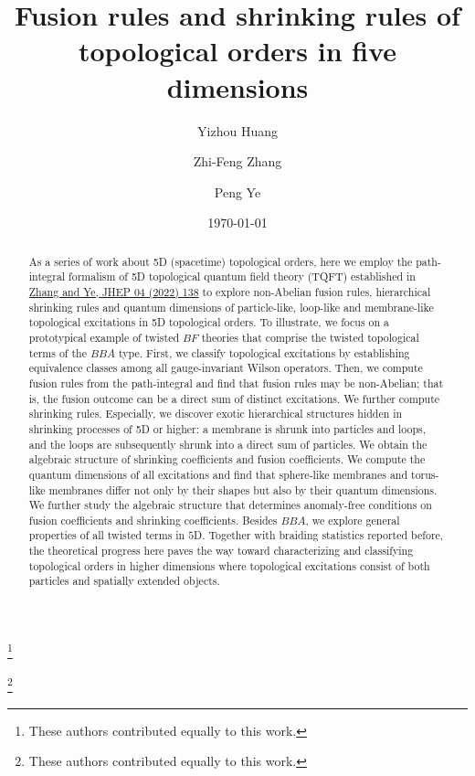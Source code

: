 \documentclass[11pt,nofootinbib,preprint]{revtex4-1}
\begin{document}
\title{Fusion rules and shrinking rules of topological orders in five dimensions}
\author{Yizhou Huang}
\thanks{These authors contributed equally to this work.}
 \author{Zhi-Feng Zhang}
\thanks{These authors contributed equally to this work.}
 \author{Peng Ye}
\date{\today}
\begin{abstract}
As a series of work about 5D (spacetime) topological orders, here we employ the path-integral formalism of 5D  topological quantum field theory  (TQFT) established in \href{https://doi.org/10.1007/JHEP04(2022)138}{Zhang and Ye, JHEP 04 (2022) 138}  to explore non-Abelian fusion rules,  hierarchical shrinking rules and quantum dimensions of particle-like, loop-like and membrane-like topological excitations in 5D topological orders.  To illustrate, we focus on a prototypical example of twisted $BF$ theories that comprise the twisted topological terms of the $BBA$ type. First, we classify topological excitations by establishing equivalence classes among all gauge-invariant Wilson operators. Then, we compute fusion rules from the path-integral and find that fusion rules may be non-Abelian; that is, the fusion outcome can be a direct sum of distinct excitations. We further compute shrinking rules. Especially, we discover exotic hierarchical structures hidden in shrinking processes of 5D or higher:  a membrane is shrunk into particles and loops, and the loops are subsequently shrunk into a direct sum of particles. We obtain the algebraic structure of shrinking coefficients and fusion coefficients.  We compute the quantum dimensions of all excitations and find that sphere-like membranes and torus-like membranes differ not only by their shapes but also by their quantum dimensions. We further study the algebraic structure that determines anomaly-free conditions on fusion coefficients and shrinking coefficients. Besides $BBA$, we explore general properties of all twisted terms in $5$D. Together with braiding statistics reported before, the theoretical progress here paves the way toward characterizing and classifying topological orders in higher dimensions where topological excitations consist of both particles and spatially extended objects. 
\end{abstract}
\maketitle
\newpage
\tableofcontents{}
\end{document}
